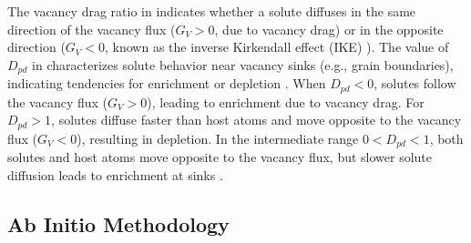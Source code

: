 \documentclass[preprint,12pt]{elsarticle}
\begin{document}
\noindent The vacancy drag ratio in  indicates whether a solute diffuses in the same direction of the vacancy flux  ($G_V > 0$, due to vacancy drag) or in the opposite direction ($G_V < 0$, known as the inverse Kirkendall effect (IKE) \citep{marwick_segregation_1978}). The value of \( D_{pd} \) in  characterizes solute behavior near vacancy sinks (e.g., grain boundaries), indicating tendencies for enrichment or depletion \citep{messina_exact_2014}. When \( D_{pd} < 0 \), solutes follow the vacancy flux (\( G_V > 0 \)), leading to enrichment due to vacancy drag. For \( D_{pd} > 1 \), solutes diffuse faster than host atoms and move opposite to the vacancy flux (\( G_V < 0 \)), resulting in depletion. In the intermediate range \( 0 < D_{pd} < 1 \), both solutes and host atoms move opposite to the vacancy flux, but slower solute diffusion leads to enrichment at sinks \cite{messina_exact_2014}.

\FloatBarrier
\subsection{Ab Initio Methodology}
\end{document}
